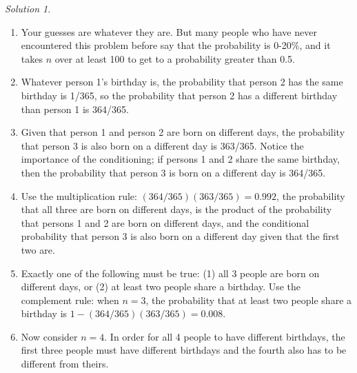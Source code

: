 \documentclass[
  letterpaper,
  DIV=11,
  numbers=noendperiod]{scrreprt}
\providecommand{\tightlist}{%
  \setlength{\itemsep}{0pt}\setlength{\parskip}{0pt}}
\theoremstyle{plain}
\theoremstyle{definition}
\theoremstyle{definition}
\theoremstyle{definition}
\theoremstyle{remark}
\newtheorem{refsolution}{Solution}[chapter]
\begin{document}
\begin{tcolorbox}
\begin{refsolution}
\begin{enumerate}
\def\labelenumi{\arabic{enumi}.}
\tightlist
\item
  Your guesses are whatever they are. But many people who have never
  encountered this problem before say that the probability is 0-20\%,
  and it takes \(n\) over at least 100 to get to a probability greater
  than 0.5.
\item
  Whatever person 1's birthday is, the probability that person 2 has the
  same birthday\footnotemark{} is 1/365, so the probability that person
  2 has a different birthday than person 1 is 364/365.
\item
  Given that person 1 and person 2 are born on different days, the
  probability that person 3 is also born on a different day is 363/365.
  Notice the importance of the conditioning; if persons 1 and 2 share
  the same birthday, then the probability that person 3 is born on a
  different day is 364/365.
\item
  Use the multiplication rule: \((364/365)(363/365) = 0.992\), the
  probability that all three are born on different days, is the product
  of the probability that persons 1 and 2 are born on different days,
  and the conditional probability that person 3 is also born on a
  different day given that the first two are.
\item
  Exactly one of the following must be true: (1) all 3 people are born
  on different days, or (2) at least two people share a birthday. Use
  the complement rule: when \(n=3\), the probability that at least two
  people share a birthday is \(1-(364/365)(363/365) = 0.008\).
\item
  Now consider \(n=4\). In order for all 4 people to have different
  birthdays, the first three people must have different birthdays and
  the fourth also has to be different from theirs.


\end{enumerate}
\end{refsolution}
\end{tcolorbox}
\end{document}
